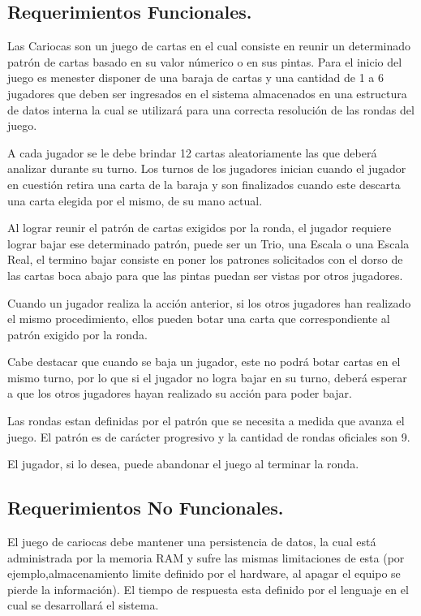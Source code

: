 \documentclass[60pt]{article}
\begin{document}
\subsection{Requerimientos Funcionales.}\label{cap:requerimientos-funcionales}
Las Cariocas son un juego de cartas en el cual consiste en reunir un determinado patrón de cartas basado en su valor númerico o en sus pintas. Para el inicio del juego es menester disponer de una baraja de cartas y una cantidad de 1 a 6 jugadores que deben ser ingresados en el sistema almacenados en una estructura de datos interna la cual se utilizará para una correcta resolución de las rondas del juego. 

A cada jugador se le debe brindar 12 cartas aleatoriamente las que deberá analizar durante su turno. Los turnos de los jugadores inician cuando el jugador en cuestión retira una carta de la baraja y son finalizados cuando este descarta una carta elegida por el mismo, de su mano actual.

Al lograr reunir el patrón de cartas exigidos por la ronda, el jugador requiere lograr bajar ese determinado patrón, puede ser un Trio, una Escala o una Escala Real, el termino bajar consiste en poner los patrones solicitados con el dorso de las cartas boca abajo para que las pintas puedan ser vistas por otros jugadores.

Cuando un jugador realiza la acción anterior, si los otros jugadores han realizado el mismo procedimiento, ellos pueden botar una carta que correspondiente al patrón exigido por la ronda.

Cabe destacar que cuando se baja un jugador, este no podrá botar cartas en el mismo turno, por lo que si el jugador no logra bajar en su turno, deberá esperar a que los otros jugadores hayan realizado su acción para poder bajar.

Las rondas estan definidas por el patrón que se necesita a medida que avanza el juego. El patrón es de carácter progresivo y la cantidad de rondas oficiales son 9.

El jugador, si lo desea, puede abandonar el juego al terminar la ronda.
\subsection{Requerimientos No Funcionales.}\label{cap:requerimientos-no-funcionales}
El juego de cariocas debe mantener una persistencia de datos, la cual está administrada por la memoria RAM y sufre las mismas limitaciones de esta (por ejemplo,almacenamiento limite definido por el hardware, al apagar el equipo se pierde la información).  El tiempo de respuesta esta definido por el lenguaje en el cual se desarrollará el sistema.
\end{document}
